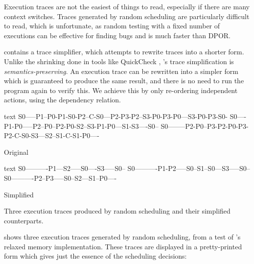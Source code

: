 Execution traces are not the easiest of things to read, especially if
there are many context switches.  Traces generated by random
scheduling are particularly difficult to read, which is unfortunate,
as random testing with a fixed number of executions can be effective
for finding bugs and is much faster than DPOR.

\dejafu{} contains a trace simplifier, which attempts to rewrite
traces into a shorter form.  Unlike the shrinking done in tools like
QuickCheck \parencite{claessen2000}, \dejafu{}'s trace simplification is
\emph{semantics-preserving}.  An execution trace can be rewritten into
a simpler form which is guaranteed to produce the same result, and
there is no need to run the program again to verify this.  We achieve
this by only re-ordering independent actions, using the dependency
relation.

\begin{listing}
\begin{sublisting}{\textwidth}
\centering
\begin{cminted}{text}
S0-----P1--P0-P1-S0-P2--C-S0---P2-P3-P2--S3-P0-P3-P0---S3-P0-P3-S0-
S0----P1-P0-----P2--P0--P2-P0-S2--S3-P1-P0---S1-S3----S0--
S0--------P2-P0--P3-P2-P0-P3-P2-C-S0-S3---S2--S1-C-S1-P0----
\end{cminted}
\caption{Original}\label{lst:trace_simplification_orig}
\end{sublisting}

\vspace{1.5em}

\begin{sublisting}{\textwidth}
\centering
\begin{cminted}{text}
S0----------P1---S2-----S0----S3-----S0--
S0----------P1-P2-----S0--S1--S0---S3-----S0--
S0----------P2--P3-----S0--S2---S1--P0----
\end{cminted}
\caption{Simplified}\label{lst:trace_simplification_simplified}
\end{sublisting}
\caption[The effect of trace simplification.]{Three execution traces produced by random scheduling and their simplified counterparts.}\label{lst:trace_simplification}
\end{listing}

 shows three execution traces generated
by random scheduling, from a test of \dejafu{}'s relaxed memory
implementation.  These traces are displayed in a pretty-printed form
which gives just the essence of the scheduling decisions:

